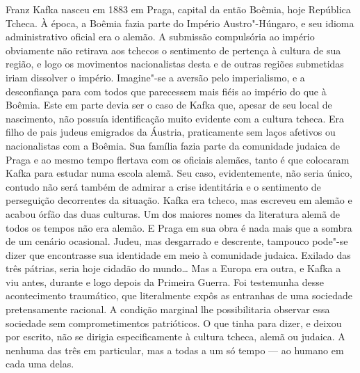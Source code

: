 Franz Kafka nasceu em 1883 em Praga, capital da então Boêmia, hoje
República Tcheca. À época, a Boêmia fazia parte do Império
Austro"-Húngaro, e seu idioma administrativo oficial era o alemão. A
submissão compulsória ao império obviamente não retirava aos tchecos o
sentimento de pertença à cultura de sua região, e logo os movimentos
nacionalistas desta e de outras regiões submetidas iriam dissolver o
império. Imagine"-se a aversão pelo imperialismo, e a desconfiança
para com todos que parecessem mais fiéis ao império do que à Boêmia.
Este em parte devia ser o caso de Kafka que, apesar de seu local de
nascimento, não possuía identificação muito evidente com a cultura
tcheca. Era filho de pais judeus emigrados da Áustria, praticamente sem
laços afetivos ou nacionalistas com a Boêmia. Sua família fazia parte
da comunidade judaica de Praga e ao mesmo tempo flertava com os
oficiais alemães, tanto é que colocaram Kafka para estudar numa escola
alemã. Seu caso, evidentemente, não seria único, contudo não será
também de admirar a crise identitária e o sentimento de perseguição
decorrentes da situação. Kafka era tcheco, mas escreveu em alemão e
acabou órfão das duas culturas. Um dos maiores nomes da literatura
alemã de todos os tempos não era alemão. E Praga em sua obra é nada
mais que a sombra de um cenário ocasional. Judeu, mas desgarrado e
descrente, tampouco pode"-se dizer que encontrasse sua identidade em
meio à comunidade judaica. Exilado das três pátrias, seria hoje cidadão
do mundo\ldots{} Mas a Europa era outra, e Kafka a viu antes, durante e logo
depois da Primeira Guerra. Foi testemunha desse acontecimento
traumático, que literalmente expôs as entranhas de uma sociedade
pretensamente racional. A condição marginal lhe possibilitaria observar
essa sociedade sem comprometimentos patrióticos. O que tinha para
dizer, e deixou por escrito, não se dirigia especificamente à cultura
tcheca, alemã ou judaica. A nenhuma das três em particular, mas a todas
a um só tempo --- ao humano em cada uma delas.

